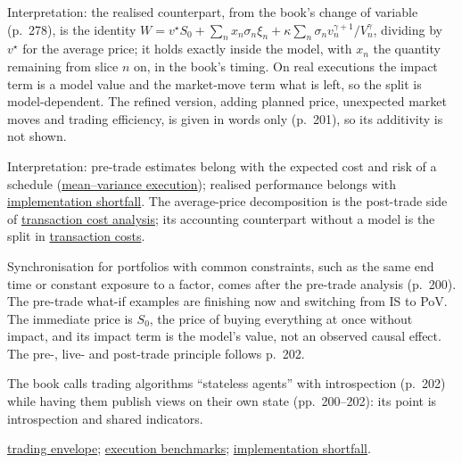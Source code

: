 \begin{qfmethod}
Interpretation: the realised counterpart, from the book's change of variable (p.~278), is the identity $W=v^\star S_0+\sum_nx_n\sigma_n\xi_n+\kappa\sum_n\sigma_nv_n^{\gamma+1}/V_n^\gamma$, dividing by $v^\star$ for the average price; it holds exactly inside the model, with $x_n$ the quantity remaining from slice $n$ on, in the book's timing. On real executions the impact term is a model value and the market-move term what is left, so the split is model-dependent. The refined version, adding planned price, unexpected market moves and trading efficiency, is given in words only (p.~201), so its additivity is not shown.

 Interpretation: pre-trade estimates belong with the expected cost and risk of a schedule (\hyperref[mod:almgren-chriss-execution]{mean--variance execution}); realised performance belongs with \hyperref[def:implementation-shortfall]{implementation shortfall}. The average-price decomposition is the post-trade side of \hyperref[meth:transaction-cost-analysis]{transaction cost analysis}; its accounting counterpart without a model is the split in \hyperref[def:transaction-costs]{transaction costs}.

 Synchronisation for portfolios with common constraints, such as the same end time or constant exposure to a factor, comes after the pre-trade analysis (p.~200). The pre-trade what-if examples are finishing now and switching from IS to PoV. The immediate price is $S_0$, the price of buying everything at once without impact, and its impact term is the model's value, not an observed causal effect. The pre-, live- and post-trade principle follows p.~202.

The book calls trading algorithms ``stateless agents'' with introspection (p.~202) while having them publish views on their own state (pp.~200--202): its point is introspection and shared indicators.

 \hyperref[def:trading-envelope]{trading envelope}; \hyperref[def:execution-benchmark]{execution benchmarks}; \hyperref[def:implementation-shortfall]{implementation shortfall}.

\end{qfmethod}

